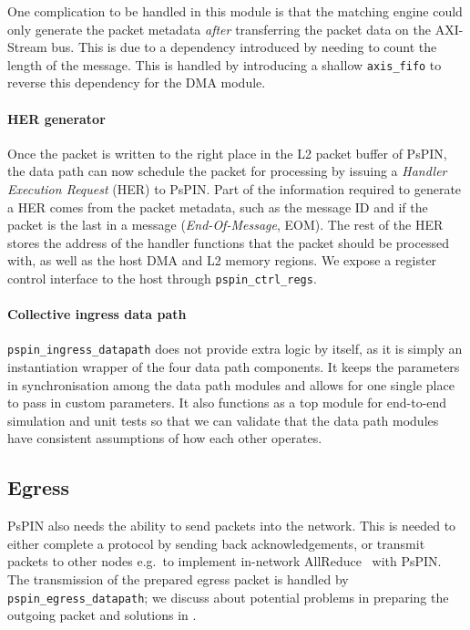 One complication to be handled in this module is that the matching engine could only generate the packet metadata \emph{after} transferring the packet data on the AXI-Stream bus.  This is due to a dependency introduced by needing to count the length of the message.  This is handled by introducing a shallow \texttt{axis\_\-fifo} to reverse this dependency for the DMA module.

\paragraph{HER generator} Once the packet is written to the right place in the L2 packet buffer of PsPIN, the data path can now schedule the packet for processing by issuing a \emph{Handler Execution Request} (HER) to PsPIN.  Part of the information required to generate a HER comes from the packet metadata, such as the message ID and if the packet is the last in a message (\emph{End-Of-Message}, EOM).  The rest of the HER stores the address of the handler functions that the packet should be processed with, as well as the host DMA and L2 memory regions.  We expose a register control interface to the host through \texttt{pspin\_\-ctrl\_\-regs}.


\paragraph{Collective ingress data path} \texttt{pspin\_\-ingress\_\-datapath} does not provide extra logic by itself, as it is simply an instantiation wrapper of the four data path components.  It keeps the parameters in synchronisation among the data path modules and allows for one single place to pass in custom parameters.  It also functions as a top module for end-to-end simulation and unit tests so that we can validate that the data path modules have consistent assumptions of how each other operates.
 
\subsection{Egress}

PsPIN also needs the ability to send packets into the network.  This is needed to either complete a protocol by sending back acknowledgements, or transmit packets to other nodes e.g.\ to implement in-network AllReduce~\cite{de_sensi_flare_2021} with PsPIN.  The transmission of the prepared egress packet is handled by \texttt{pspin\_\-egress\_\-datapath}; we discuss about potential problems in preparing the outgoing packet and solutions in .

